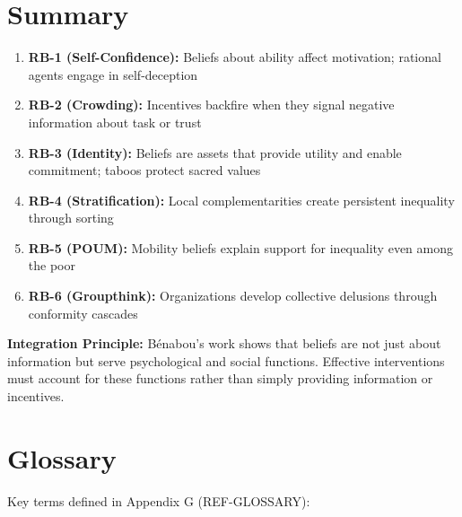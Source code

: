 \section{Summary}
\label{sec:rb-summary}

\begin{tcolorbox}[colback=blue!5!white,colframe=blue!75!black,title=Key Takeaways]
\begin{enumerate}
    \item \textbf{RB-1 (Self-Confidence):} Beliefs about ability affect motivation; rational agents engage in self-deception
    \item \textbf{RB-2 (Crowding):} Incentives backfire when they signal negative information about task or trust
    \item \textbf{RB-3 (Identity):} Beliefs are assets that provide utility and enable commitment; taboos protect sacred values
    \item \textbf{RB-4 (Stratification):} Local complementarities create persistent inequality through sorting
    \item \textbf{RB-5 (POUM):} Mobility beliefs explain support for inequality even among the poor
    \item \textbf{RB-6 (Groupthink):} Organizations develop collective delusions through conformity cascades
\end{enumerate}

\textbf{Integration Principle:} Bénabou's work shows that beliefs are not just about information but serve psychological and social functions. Effective interventions must account for these functions rather than simply providing information or incentives.
\end{tcolorbox}

\section{Glossary}
\label{sec:rb-glossary}

Key terms defined in Appendix G (REF-GLOSSARY):

